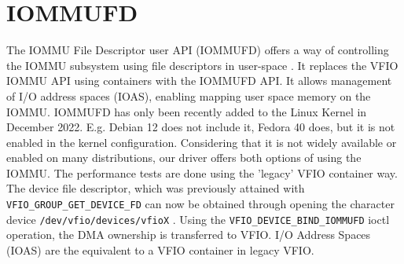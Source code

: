 \section{IOMMUFD}
The IOMMU File Descriptor user API (IOMMUFD) offers a way of controlling the IOMMU subsystem using file descriptors in user-space \cite{iommufdkerneldocs}. It replaces the VFIO IOMMU API using containers with the IOMMUFD API.
It allows management of I/O address spaces (IOAS), enabling mapping user space memory on the IOMMU.
IOMMUFD has only been recently added to the Linux Kernel in December 2022. E.g. Debian 12 does not include it, Fedora 40 does, but it is not enabled in the kernel configuration. Considering that it is not widely available or enabled on many distributions, our driver offers both options of using the IOMMU. The performance tests are done using the 'legacy' VFIO container way.
The device file descriptor, which was previously attained with \texttt{VFIO\_GROUP\_GET\_DEVICE\_FD} can now be obtained through opening the character device \texttt{/dev/vfio/devices/vfioX} \cite{vfiokerneldocs}.
Using the \texttt{VFIO\_DEVICE\_BIND\_IOMMUFD} ioctl operation, the  DMA ownership is transferred to VFIO.
I/O Address Spaces (IOAS) are the equivalent to a VFIO container in legacy VFIO.



